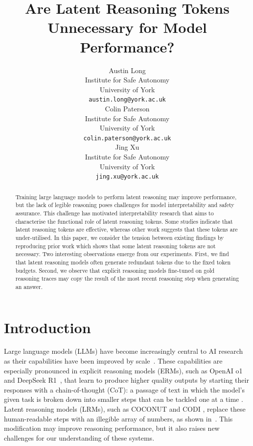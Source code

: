 \documentclass[11pt]{article}
\title{Are Latent Reasoning Tokens Unnecessary for Model Performance?}
\author{Austin Long \\
  Institute for Safe Autonomy \\
  University of York \\
  \texttt{austin.long@york.ac.uk} \\\And
  Colin Paterson \\
  Institute for Safe Autonomy \\
  University of York \\
  \texttt{colin.paterson@york.ac.uk} \\\And
  Jing Xu \\
  Institute for Safe Autonomy \\
  University of York \\
  \texttt{jing.xu@york.ac.uk} \\}
\begin{document}
\maketitle
\begin{abstract}
Training large language models to perform latent reasoning may improve performance, but the lack of legible reasoning poses challenges for model interpretability and safety assurance. This challenge has motivated interpretability research that aims to characterise the functional role of latent reasoning tokens. Some studies indicate that latent reasoning tokens are effective, whereas other work suggests that these tokens are under-utilised. In this paper, we consider the tension between existing findings by reproducing prior work which shows that some latent reasoning tokens are not necessary. 
Two interesting observations emerge from our experiments. First, we find that latent reasoning models often generate redundant tokens due to the fixed token budgets. Second, we observe that explicit reasoning models fine-tuned on gold reasoning traces may copy the result of the most recent reasoning step when generating an answer. 
\end{abstract}

\section{Introduction}

Large language models (LLMs) have become increasingly central to AI research as their capabilities have been improved by scale~\cite{kaplan2020scaling}. These capabilities are especially pronounced in explicit reasoning models (ERMs), such as OpenAI o1~\cite{jaech2024openai} and DeepSeek R1~\cite{guo2025deepseek}, that learn to produce higher quality outputs by starting their responses with a chain-of-thought (CoT): a passage of text in which the model's given task is broken down into smaller steps that can be tackled one at a time \cite{wei2022chain}. Latent reasoning models (LRMs), such as COCONUT \cite{hao2024training} and CODI \cite{shen2025codi}, replace these human-readable steps with an illegible array of numbers, as shown in~. This modification may improve reasoning performance, but it also raises new challenges for our understanding of these systems.
\end{document}
